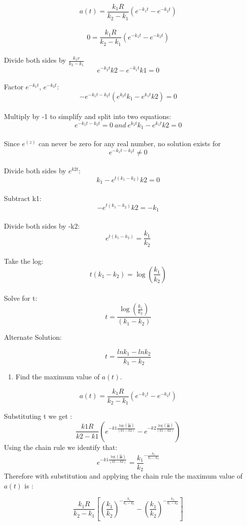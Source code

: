 \documentclass[]{article}
\providecommand{\tightlist}{%
  \setlength{\itemsep}{0pt}\setlength{\parskip}{0pt}}
\begin{document}
\[a(t) = \frac{k_1 R}{k_2 - k_1}(e^{-k_1 t}-e^{-k_2 t})\]\\
\[0 = \frac{k_1 R}{k_2 - k_1}(e^{-k_1 t}-e^{-k_2 t})\]\\
Divide both sides by \(\frac{k_1 r}{k_2 - k_1}\)\\
\[e^{-k_2 t}k2 - e^{-k_1 t}k1 = 0\]\\
Factor \(e^{-k_1 t}\), \(e^{-k_2 t}\):\\
\[-e^{-k_1 t - k_2 t}(e^{k_2 t}k_1 - e^{k_1 t}k2) = 0\]\\
Multiply by -1 to simplify and split into two equations:\\
\[e^{-k_1 t - k_2 t} = 0 ~and~e^{k_2 t}k_1 - e^{k_1 t}k2= 0\]\\
Since \(e^(z)\) can never be zero for any real number, no solution
exists for \[e^{-k_1 t - k_2 t} \neq 0\]\\
Divide both sides by \(e^{k2 t}\):\\
\[k_1 - e^{t (k_1 - k_2)}k2= 0\]\\
Subtract k1:\\
\[- e^{t (k_1 - k_2)}k2= -k_1\]\\
Divide both sides by -k2:\\
\[e^{t (k_1 - k_2)}= \frac{k_1}{k_2}\]\\
Take the log: \[t (k_1 - k_2)= \log{(\frac{k_1}{k_2})}\]\\
Solve for t: \[t = \frac{\log{(\frac{k_1}{k_2})}}{(k_1 - k_2)}\]

Alternate Solution:

\[t = \frac{lnk_1 - lnk_2}{k_1 - k_2}\]

\newpage

\begin{enumerate}
\def\labelenumi{(\alph{enumi})}
\setcounter{enumi}{1}
\tightlist
\item
  Find the maximum value of \(a(t)\).
\end{enumerate}

\[a(t) = \frac{k_1R}{k_2-k_1}(e^{-k_1t}-e^{-k_2t})\]

Substituting t we get :
\[\frac{k1 R}{k2 - k1}(e^{-k1 \frac{\log{(\frac{k1}{k2})}}{(k1 - k2)}}-e^{-k2 \frac{\log{(\frac{k1}{k2})}}{(k1 - k2)}})\]
Using the chain rule we identify that:
\[e^{-k1 \frac{\log{(\frac{k1}{k2})}}{(k1 - k2)}}=\frac{k_1}{k_2}^{-\frac{k_1}{k_1 - k_2}}\]
Therefore with substitution and applying the chain rule the maximum
value of \(a(t)\) is :

\[\frac{k_1R}{k_2-k_1}[(\frac{k_1}{k_2})^{-\frac{k_1}{k_1-k_2}}-(\frac{k_1}{k_2})^{-\frac{k_2}{k_1-k_2}}]\]
\end{document}
